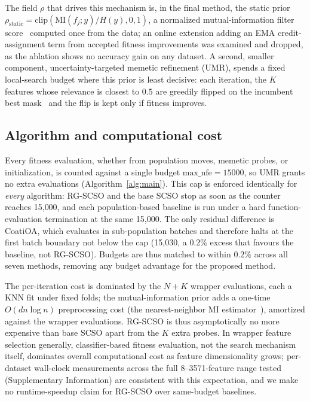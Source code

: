 \documentclass[preprint,3p,times]{elsarticle}
\begin{document}
The field $\rho$ that drives this mechanism is, in the final method, the
static prior $\rho_{\mathrm{static}}=\mathrm{clip}(\mathrm{MI}(f_j;y)/H(y),0,1)$,
a normalized mutual-information filter score~\cite{mrmr,kraskov} computed once
from the data; an online extension adding an EMA credit-assignment term from
accepted fitness improvements was examined and dropped, as the ablation
shows no accuracy gain on any dataset. A second, smaller component,
uncertainty-targeted memetic refinement (UMR), spends a fixed local-search
budget where this prior is least decisive: each iteration, the $K$ features
whose relevance is closest to $0.5$ are greedily flipped on the incumbent
best mask~\cite{neri} and the flip is kept only if fitness improves.

\subsection{Algorithm and computational cost}
Every fitness evaluation, whether from population moves, memetic probes, or
initialization, is counted against a single budget
$\mathrm{max\_nfe}=15000$, so UMR grants no extra evaluations
(Algorithm~\ref{alg:main}). This cap is enforced identically for \emph{every}
algorithm: RG-SCSO and the base SCSO stop as soon as the counter reaches
15{,}000, and each population-based baseline is run under a hard
function-evaluation termination at the same 15{,}000. The only residual
difference is CoatiOA, which evaluates in sub-population batches and therefore
halts at the first batch boundary not below the cap (15{,}030, a $0.2\%$
excess that favours the baseline, not RG-SCSO). Budgets are thus matched to
within $0.2\%$ across all seven methods, removing any budget advantage for the
proposed method.

The per-iteration cost is dominated by the $N+K$ wrapper evaluations, each a
KNN fit under fixed folds; the mutual-information prior adds a one-time
$O(dn\log n)$ preprocessing cost (the nearest-neighbor MI
estimator~\cite{kraskov}), amortized against the wrapper evaluations. RG-SCSO
is thus asymptotically no more expensive than base SCSO apart from the $K$
extra probes. In wrapper feature selection generally, classifier-based
fitness evaluation, not the search mechanism itself, dominates overall
computational cost as feature dimensionality grows; per-dataset wall-clock
measurements across the full 8--3571-feature range tested
(Supplementary Information) are consistent with this expectation, and we
make no runtime-speedup claim for RG-SCSO over same-budget baselines.
\end{document}
